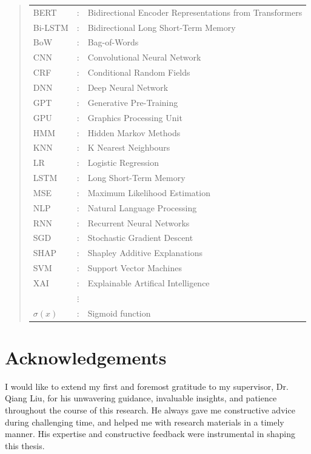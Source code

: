 \documentclass[ %
                    author={Bocheng Wang},
                supervisor={Dr. Qiang Liu},
                    degree={MSc},
                     title={A Research on Identification of Suicide Ideation in Texts with Multiple Models},
                      type={},
                      year={2024}]{dissertation}
\begin{document}
\begin{quote}
\noindent
\begin{tabular}{lcl}
      BERT    &: & Bidirectional Encoder Representations from Transformers \\
      Bi-LSTM &: & Bidirectional Long Short-Term Memory \\
      BoW     &: & Bag-of-Words \\
      CNN     &: & Convolutional Neural Network \\
      CRF     &: & Conditional Random Fields \\
      DNN     &: & Deep Neural Network \\
      GPT     &: & Generative Pre-Training \\
      GPU     &: & Graphics Processing Unit \\
      HMM     &: & Hidden Markov Methods \\
      KNN     &: & K Nearest Neighbours \\
      LR      &: & Logistic Regression \\
      LSTM    &: & Long Short-Term Memory \\
      MSE     &: & Maximum Likelihood Estimation \\
      NLP     &: & Natural Language Processing \\
      RNN     &: & Recurrent Neural Networks \\
      SGD     &: & Stochastic Gradient Descent \\
      SHAP    &: & Shapley Additive Explanations \\
      SVM     &: & Support Vector Machines \\
      XAI     &: & Explainable Artifical Intelligence \\
              &$\vdots$ \\
      ${\sigma}( x )$ &: & Sigmoid function \\
\end{tabular}
\end{quote}


\chapter*{Acknowledgements}
\noindent
I would like to extend my first and foremost gratitude to my supervisor, Dr. Qiang Liu, for his unwavering guidance, invaluable insights, and patience throughout the course of this research. He always gave me constructive advice during challenging time, and helped me with research materials in a timely manner. His expertise and constructive feedback were instrumental in shaping this thesis.
\end{document}
